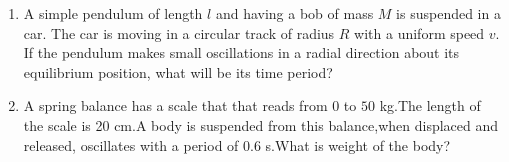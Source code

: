 \begin{enumerate}[label=\thesection.\arabic*,ref=\thesection.\theenumi]
\item A simple pendulum of length $l$ and having a bob of mass $M$ is suspended in a car. The car is moving in a circular track of radius $R$ with a uniform speed $v$. If the pendulum makes small oscillations in a radial direction about its equilibrium position, what will be its time period?
\pagebreak
\item A spring balance has a scale that that reads from $0$ to $50$ kg.The length of the scale is 20 cm.A body is suspended from this balance,when displaced and released, oscillates with a period of 0.6 s.What is weight of the body? 
\solution

\pagebreak
\end{enumerate}
